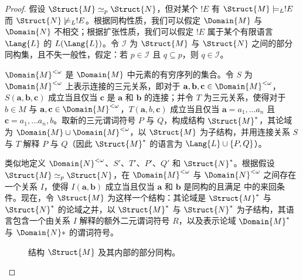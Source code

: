 \documentclass[../../../include/open-logic-section]{subfiles}
\begin{document}
\begin{proof}
假设 $\Struct{M} \simeq_p \Struct{N}$，但对某个 $!E$ 有 $\Struct{M} \models_L !E$ 而 $\Struct{N} \not\models_L !E$。根据同构性质，我们可以假定 $\Domain{M}$ 与 $\Domain{N}$ 不相交；根据扩张性质，我们可以假定 $!E$ 属于某个有限语言 $\Lang{L}$ 的 $L(\Lang{L})$。令 $\mathcal{I}$ 为 $\Struct{M}$ 与 $\Struct{N}$ 之间的部分同构集，且不失一般性，假定：若 $p \in \mathcal{I}$ 且 $q \subseteq p$，则 $q \in \mathcal{I}$。

$\Domain{M}^{<\omega}$ 是 $\Domain{M}$ 中元素的有穷序列的集合。令 $S$ 为 $\Domain{M}^{<\omega}$ 上表示连接的三元关系，即对于 $\mathbf{a}, \mathbf{b},
\mathbf{c} \in \Domain{M}^{<\omega}$，$S(\mathbf{a}, \mathbf{b},
\mathbf{c})$ 成立当且仅当 $\mathbf{c}$ 是 $\mathbf{a}$ 和 $\mathbf{b}$ 的连接；并令 $T$ 为三元关系，使得对于 $b \in M$ 与 $\mathbf{a}, \mathbf{c} \in \Domain{M}^{<\omega}$，$T(\mathbf{a}, b, \mathbf{c})$ 成立当且仅当 $\mathbf{a} =
a_1, \dots a_n$ 且 $\mathbf{c} = a_1, \dots a_n, b$。取新的三元谓词符号 $P$ 与 $Q$，构成结构 $\Struct{M}^*$，其论域为 $\Domain{M} \cup \Domain{M}^{<\omega}$，以 $\Struct{M}$ 为子结构，并用连接关系 $S$ 与 $T$ 解释 $P$ 与 $Q$（因此 $\Struct{M}^*$ 的语言为 $\Lang{L} \cup \{ P, Q\}$）。

类似地定义 $\Domain{N}^{<\omega}$、$S'$、$T'$、$P'$、$Q'$ 和 $\Struct{N}^*$。根据假设$\Struct{M} \simeq_p
\Struct{N}$，在 $\Domain{M}^{<\omega}$ 与 $\Domain{N}^{<\omega}$ 之间存在一个关系 $I$，使得 $I(\mathbf{a}, \mathbf{b})$ 成立当且仅当 $\mathbf{a}$ 和 $\mathbf{b}$ 是同构的且满足  中的来回条件。现在，令 $\Struct{M}$ 为这样一个结构：其论域是 $\Struct{M}^*$ 与 $\Struct{N}^*$ 的论域之并，以 $\Struct{M}^*$ 与 $\Struct{N}^*$ 为子结构，其语言包含一个由关系 $I$ 解释的额外二元谓词符号 $R$，以及表示论域 $\Domain{M}^*$ 与 $\Domain{N}*$ 的谓词符号。

\begin{figure}[h]
  \centering
  \caption{结构 $\Struct{M}$ 及其内部的部分同构。}
\end{figure}


\end{proof}
\end{document}
